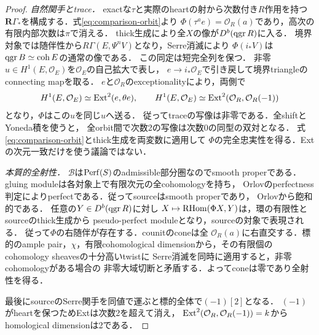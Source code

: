 \begin{proof}
\emph{自然関手とtrace．}
exactな$\tau$と実際のheartの射から次数付き$R$作用を持つ
$\mathbf R\Gamma_*$を構成する．式\eqref{eq:comparison-orbit}より
$\Phi(\tau^ae)=\mathcal O_R(a)$であり，高次の有限内部次数は$\pi$で消える．
thick生成により全$X$の像が$D^b(\operatorname{qgr} R)$に入る．
境界対象では随伴性から$R\Gamma(E,\Psi^nV)$となり，Serre消滅により
$\Phi(i_*V)$は$\operatorname{qgr} B\simeq\operatorname{coh} E$の通常の像である．
この同定は短完全列を保つ．
非零$u\in H^1(E,\mathcal O_E)$を$\mathcal O_E$の自己拡大で表し，
$e\to i_*\mathcal O_E$で引き戻して境界triangleのconnecting mapを取る．
$e$と$\mathcal O_R$のexceptionalityにより，両側で
\[
H^1(E,\mathcal O_E)\simeq\operatorname{Ext}^2(e,\theta e),\qquad
H^1(E,\mathcal O_E)\simeq\operatorname{Ext}^2(\mathcal O_R,\mathcal O_R(-1))
\]
となり，$\Phi$はこの$u$を同じ$u$へ送る．
従ってtraceの写像は非零である．全shiftとYoneda積を使うと，
全orbit間で次数2の写像は次数0の同型の双対となる．
式\eqref{eq:comparison-orbit}とthick生成を両変数に適用して
$\Phi$の完全忠実性を得る．Extの次元一致だけを使う議論ではない．

\emph{本質的全射性．}
$\mathcal B$は$\operatorname{Perf}(S)$のadmissible部分圏なのでsmooth properである．
gluing moduleは各対象上で有限次元の全cohomologyを持ち，
Orlovのperfectness判定によりperfectである．従ってsourceはsmooth properであり，
Orlov\cite[Theorems 3.18, 3.25, Corollary 3.19]{OrlovResonance}から飽和的である．
任意の$Y\in D^b(\operatorname{qgr} R)$に対し
$X\mapsto\operatorname{RHom}(\Phi X,Y)$は，環の有限性とsourceのthick生成から
pseudo-perfect moduleとなり，sourceの対象で表現される．
従って$\Phi$の右随伴が存在する．counitのconeは全
$\mathcal O_R(a)$に右直交する．標的のample pair，$\chi$，有限cohomological
 dimensionから，その有限個のcohomology sheavesの十分高いtwistに
Serre消滅を同時に適用すると，非零cohomologyがある場合の
非零大域切断と矛盾する．よってconeは零であり全射性を得る．

最後にsourceのSerre関手を同値で運ぶと標的全体で$(-1)[2]$となる．
$(-1)$がheartを保つためExtは次数2を超えて消え，
$\operatorname{Ext}^2(\mathcal O_R,\mathcal O_R(-1))=k$からhomological dimensionは2である．
\end{proof}

